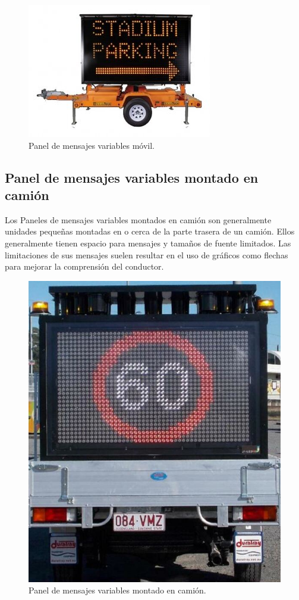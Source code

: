 \begin{figure}[hptb]
	\centering
	\includegraphics[scale=1]{../Figures/vmsmovil.jpg} 
	\caption{Panel de mensajes variables móvil.}
	\label{fig:vmsm}
\end{figure}


\subsection{Panel de mensajes variables montado en camión}

Los Paneles de mensajes variables montados en camión son generalmente unidades pequeñas montadas en o cerca de la parte trasera de un camión. Ellos generalmente tienen espacio para mensajes y tamaños de fuente limitados. Las limitaciones de sus mensajes suelen resultar en el uso de gráficos como flechas para mejorar la comprensión del conductor.

\begin{figure}[hptb]
	\centering
	\includegraphics[scale=1]{../Figures/vmstruck.png} 
	\caption{Panel de mensajes variables montado en camión.}
	\label{fig:vmsc}
\end{figure}


